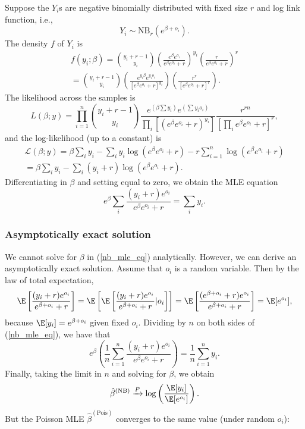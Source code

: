 \documentclass[12pt]{article}
\begin{document}
Suppose the $Y_i$s are negative binomially distributed with fixed size $ r$ and log link function, i.e.,
$$ Y_i \sim \textrm{NB}_r(e^{\beta + o_i}).$$ The density $f$ of $Y_i$ is
\begin{multline*}
f(y_i; \beta) = \binom{y_i + r - 1}{y_i} \left( \frac{ e^{\beta} e^{o_i} }{ e^{\beta}e^{o_i} + r } \right)^{y_i} \left( \frac{ r }{ e^{\beta}e^{o_i} + r } \right)^r \\ = \binom{y_i + r - 1}{y_i} \left( \frac{ e^{y_i\beta} e^{y_i o_i} }{ [e^\beta e^{o_i} + r]^{y_i} } \right) \left( \frac{r^r}{[e^{\beta} e^{o_i} + r ]^r} \right).
\end{multline*}
The likelihood across the samples is
$$ L(\beta; y) = \prod_{i=1}^n \binom{ y_i + r - 1 }{ y_i }  \frac{ e^{ (\beta \sum y_i)} e^{\left(\sum y_i o_i \right)} }{  \prod_{i} \left[ \left( e^\beta e^{o_i} + r \right)^{y_i} \right] } \frac{ r^{rn} }{ \left[ \prod_i e^{\beta} e^{o_i} + r \right]^r },$$ and the log-likelihood (up to a constant) is
 \begin{multline*} \mathcal{L}(\beta; y) = \beta \sum_i y_i - \sum_{i}  y_i \log\left( e^\beta e^{o_i} + r \right) - r \sum_{i=1}^n \log( e^{\beta} e^{o_i} + r ) \\ = \beta \sum_{i} y_i - \sum_{i} (y_i + r) \log ( e^\beta e^{o_i} + r ). \end{multline*} Differentiating in $\beta$ and setting equal to zero, we obtain the MLE equation
 \begin{equation}\label{nb_mle_eq}
   e^\beta \sum_i \frac{ (y_i + r) e^{o_i} }{ e^\beta e^{o_i} + r  }  = \sum_i y_i. 
 \end{equation}
 
 \subsubsection{Asymptotically exact solution}
 
 We cannot solve for $\beta$ in (\ref{nb_mle_eq}) analytically. However, we can derive an asymptotically exact solution. Assume that $o_i$ is a random variable. Then by the law of total expectation,
 \begin{multline*} \E \left[ \frac{(y_i + r) e^{o_i}}{ e^{\beta + o_i} + r } \right] = \E \left[ \E\left[ \frac{ (y_i + r) e^{o_i} }{ e^{\beta + o_i} + r } | o_i\right] \right] = \E \left[ \frac{ (e^{\beta + o_i} + r) e^{o_i}}{ e^{\beta + o_i} + r } \right] = \E [ e^{o_i} ],
 \end{multline*} 
 because $\E[y_i] = e^{\beta + o_i}$ given fixed $o_i$. Dividing by $n$ on both sides of (\ref{nb_mle_eq}), we have that
 $$ e^{\beta} \left( \frac{1}{n} \sum_{i=1}^n \frac{ (y_i + r)e^{o_i} }{ e^\beta e^{o_i} + r } \right) = \frac{1}{n} \sum_{i=1}^n y_i.$$ Finally, taking the limit in $n$ and solving for $\beta$, we obtain
 \begin{equation}
\hat{\beta}^{(\textrm{NB})} \xrightarrow{P} \log\left( \frac{ \E[y_i] }{ \E[ e^{o_i} ] } \right).
 \end{equation}
 But the Poisson MLE $\hat{\beta}^{(\textrm{Pois})}$ converges to the same value (under random $o_i$):
 
\end{document}
